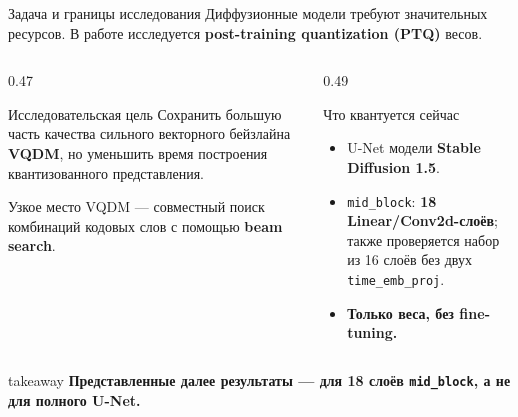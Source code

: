 \documentclass[aspectratio=169,10pt]{beamer}
\newcommand{\keypoint}[1]{%
  \begin{beamercolorbox}[
    sep=1.8mm,
    wd=\linewidth
  ]{takeaway}
    \small\bfseries #1
  \end{beamercolorbox}%
}
\newcommand{\midblock}{\texttt{mid\_block}}
\begin{document}
\begin{frame}[t]{Задача и границы исследования}
  Диффузионные модели требуют значительных ресурсов.
  В работе исследуется
  \textbf{post-training quantization (PTQ)} весов.

  \vspace{1mm}

  \begin{columns}[T,onlytextwidth]

    \begin{column}{0.47\textwidth}
      \begin{block}{Исследовательская цель}
        Сохранить большую часть качества сильного векторного
        бейзлайна \textbf{VQDM}, но уменьшить время построения
        квантизованного представления.
      \end{block}

      \small
      Узкое место VQDM --- совместный поиск комбинаций
      кодовых слов с помощью \textbf{beam search}.
    \end{column}

    \begin{column}{0.49\textwidth}
      \begin{block}{Что квантуется сейчас}
        \begin{itemize}
          \setlength{\itemsep}{2mm}

          \item U-Net модели
            \textbf{Stable Diffusion 1.5}.

          \item \midblock:
            \textbf{18 Linear/Conv2d-слоёв};
            также проверяется набор из 16 слоёв
            без двух \texttt{time\_emb\_proj}.

          \item \textbf{Только веса, без fine-tuning.}
        \end{itemize}
      \end{block}
    \end{column}

  \end{columns}

  \vfill

  \keypoint{
    Представленные далее результаты --- для 18 слоёв
    \midblock, а не для полного U-Net.
  }
\end{frame}

\end{document}
